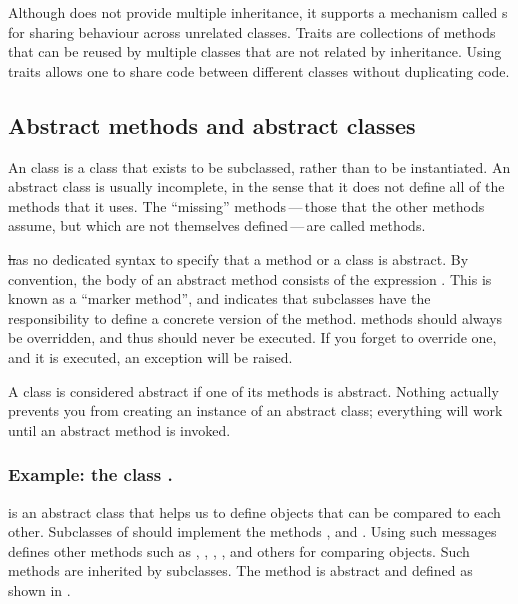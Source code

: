 \documentclass[a4paper,10pt,twoside]{book}
\begin{document}

Although \pharo does not provide multiple inheritance, it supports a mechanism called s for sharing behaviour across unrelated classes.
Traits are collections of methods that can be reused by multiple classes that are not related by inheritance. Using traits allows one to share code between different classes without duplicating code.

\subsection{Abstract methods and abstract classes}

An  class is a class that exists to be subclassed, rather than to be instantiated.
An abstract class is usually incomplete, in the sense that it does not define all of the methods that it uses.
The ``missing'' methods\,---\,those that the other methods assume, but which are not themselves defined\,---\,are called  methods.

\st has no dedicated syntax to specify that a method or a class is abstract. 
By convention, the body of an abstract method consists of the expression \mbox{.} 
This is known as a ``marker method'', and indicates that subclasses have the responsibility to define a concrete version of the method. 
 methods should always be overridden, and thus should never be executed.
If you forget to override one, and it is executed, an exception will be raised. 

A class is considered abstract if one of its methods is abstract.
Nothing actually prevents you from creating an instance of an abstract class; everything will work until an abstract method is invoked. 

\subsubsection{Example: the class .}
 is an abstract class that helps us to  define objects that can be compared to each other. Subclasses of  should implement the methods \ct{<}, \ct{=} and . Using such messages  defines other methods such as \ct{>}, \ct{>=}, \ct{<=}, ,   and others for comparing objects. Such methods are inherited by subclasses. The method  is abstract and defined as shown in .
\end{document}
